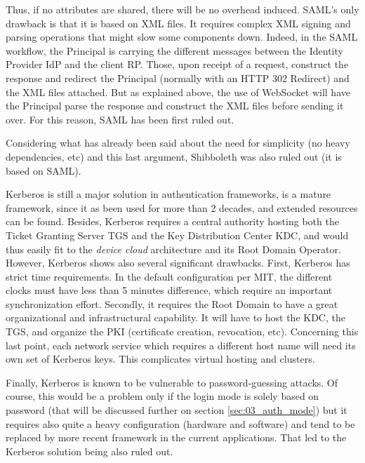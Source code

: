 Thus, if no attributes are shared, there will be no overhead induced. SAML's only drawback is that it is based on XML files. It requires complex XML signing and parsing operations that might slow some components down. Indeed, in the SAML workflow, the Principal is carrying the different messages between the Identity Provider IdP and the client RP. Those, upon receipt of a request, construct the response and redirect the Principal (normally with an HTTP 302 Redirect) and the XML files attached. But as explained above, the use of WebSocket will have the Principal parse the response and construct the XML files before sending it over. For this reason, SAML has been first ruled out.

Considering what has already been said about the need for simplicity (no heavy dependencies, etc) and this last argument, Shibboleth was also ruled out (it is based on SAML). 

Kerberos is still a major solution in authentication frameworks, is a mature framework, since it as been used for more than 2 decades, and extended resources can be found. Besides, Kerberos requires a central authority hosting both the Ticket Granting Server TGS and the Key Distribution Center KDC, and would thus easily fit to the \emph{device cloud} architecture and its Root Domain Operator. However, Kerberos shows also several significant drawbacks. First, Kerberos has strict time requirements. In the default configuration per MIT, the different clocks must have less than 5 minutes difference, which require an important synchronization effort. Secondly, it requires the Root Domain to have a great organizational and infrastructural capability. It will have to host the KDC, the TGS, and organize the PKI (certificate creation, revocation, etc). Concerning this last point, each network service which requires a different host name will need its own set of Kerberos keys. This complicates virtual hosting and clusters.

Finally, Kerberos is known to be vulnerable to password-guessing attacks. Of course, this would be a problem only if the login mode is solely based on password (that will be discussed further on section \ref{sec:03_auth_mode}) but it requires also quite a heavy configuration (hardware and software) and tend to be replaced by more recent framework in the current applications. That led to the Kerberos solution being also ruled out.

